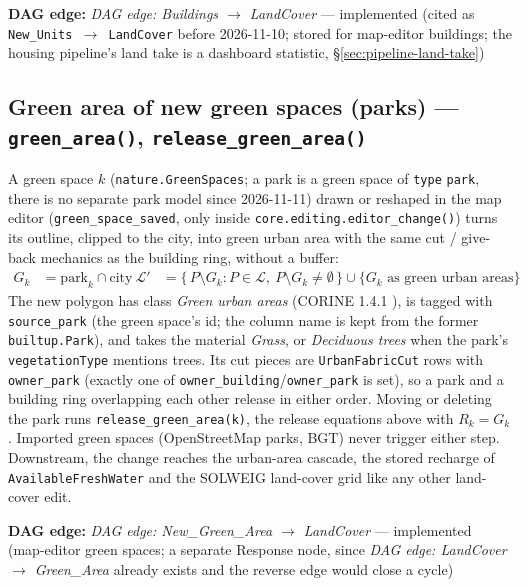 \documentclass[11pt]{article}
\newcommand{\code}[1]{\texttt{#1}}
\newcommand{\dagedge}[1]{\textit{DAG edge: #1}}
\newcommand{\statusdone}{\textcolor{green!50!black}{implemented}}
\begin{document}
\textbf{DAG edge:} \dagedge{Buildings $\rightarrow$ LandCover} --- \statusdone{} (cited as \code{New\_Units $\rightarrow$ LandCover} before 2026-11-10; stored for map-editor buildings; the housing pipeline's land take is a dashboard statistic, \S\ref{sec:pipeline-land-take})

\subsection{Green area of new green spaces (parks) --- \code{green\_area()}, \code{release\_green\_area()}}
A green space $k$ (\code{nature.GreenSpaces}; a park is a green space of \code{type} \code{park}, there is no separate park model since 2026-11-11) drawn or reshaped in the map editor (\code{green\_space\_saved}, only inside \code{core.editing.editor\_change()}) turns its outline, clipped to the city, into green urban area with the same cut / give-back mechanics as the building ring, without a buffer:
\begin{align}
  G_k &= \text{park}_k \cap \text{city} \
  \mathcal{L}' &= \{\, P \setminus G_k : P \in \mathcal{L},\ P \setminus G_k \neq \emptyset \,\} \cup \{ G_k \text{ as green urban areas} \}
\end{align}
The new polygon has class \emph{Green urban areas} (CORINE 1.4.1 \cite{CORINE}), is tagged with \code{source\_park} (the green space's id; the column name is kept from the former \code{builtup.Park}), and takes the material \emph{Grass}, or \emph{Deciduous trees} when the park's \code{vegetationType} mentions trees. Its cut pieces are \code{UrbanFabricCut} rows with \code{owner\_park} (exactly one of \code{owner\_building}/\code{owner\_park} is set), so a park and a building ring overlapping each other release in either order. Moving or deleting the park runs \code{release\_green\_area(k)}, the release equations above with $R_k = G_k$. Imported green spaces (OpenStreetMap parks, BGT) never trigger either step. Downstream, the change reaches the urban-area cascade, the stored recharge of \code{AvailableFreshWater} and the SOLWEIG land-cover grid like any other land-cover edit.

\textbf{DAG edge:} \dagedge{New\_Green\_Area $\rightarrow$ LandCover} --- \statusdone{} (map-editor green spaces; a separate Response node, since \dagedge{LandCover $\rightarrow$ Green\_Area} already exists and the reverse edge would close a cycle)
\end{document}
